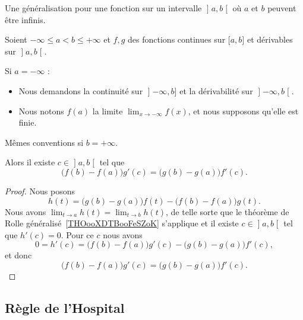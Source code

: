Une généralisation pour une fonction sur un intervalle \( \mathopen] a , b \mathclose[\) où \( a\) et \( b\) peuvent être infinis.
\begin{theorem} \label{THOooRIIBooOjkzMa}
	Soient \( -\infty\leq a<b\leq +\infty\) et \( f,g\) des fonctions continues sur \( \mathopen[ a , b \mathclose]\) et dérivables sur \( \mathopen] a , b \mathclose[\).

		Si \( a=-\infty\) :
		\begin{itemize}
			\item Nous demandons la continuité sur \( \mathopen] -\infty , b \mathclose]\) et la dérivabilité sur \( \mathopen] -\infty , b \mathclose[\).
			\item
			      Nous notons \( f(a)\) la limite \( \lim_{x\to -\infty} f(x)\), et nous supposons qu'elle est finie.
		\end{itemize}

		Mêmes conventions si \( b=+\infty\).

		Alors il existe \( c\in \mathopen] a , b \mathclose[\) tel que
	\begin{equation}
		\big( f(b)-f(a) \big)g'(c)=\big( g(b)-g(a) \big)f'(c).
	\end{equation}
\end{theorem}


\begin{proof}
	Nous posons
	\begin{equation}
		h(t)=\big( g(b)-g(a) \big)f(t)-\big( f(b)-f(a) \big)g(t).
	\end{equation}
	Nous avons \( \lim_{t\to a} h(t)=\lim_{t\to b} h(t)\), de telle sorte que le théorème de Rolle généralisé~\ref{THOooXDTBooFeSZoK} s'applique et il existe \( c\in \mathopen] a , b \mathclose[\) tel que \( h'(c)=0\). Pour ce \( c\) nous avons
	\begin{equation}
		0=h'(c)=\big( f(b)-f(a) \big)g'(c)-\big( g(b)-g(a) \big)f'(c),
	\end{equation}
	et donc
	\begin{equation}
		\big( f(b)-f(a) \big)g'(c)=\big( g(b)-g(a) \big)f'(c).
	\end{equation}
\end{proof}

\subsection{Règle de l'Hospital}

